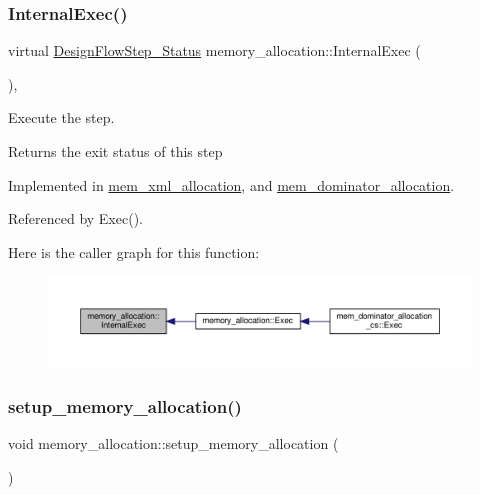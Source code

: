 \subsubsection{\texorpdfstring{Internal\+Exec()}{InternalExec()}}
{\footnotesize\ttfamily virtual \hyperlink{design__flow__step_8hpp_afb1f0d73069c26076b8d31dbc8ebecdf}{Design\+Flow\+Step\+\_\+\+Status} memory\+\_\+allocation\+::\+Internal\+Exec (\begin{DoxyParamCaption}{ }\end{DoxyParamCaption})\hspace{0.3cm}{\ttfamily [protected]}, {}}



Execute the step. 

\begin{DoxyReturn}{Returns}
the exit status of this step 
\end{DoxyReturn}


Implemented in \hyperlink{classmem__xml__allocation_ab52f147c4c950b89428a1c6ad515a7a3}{mem\+\_\+xml\+\_\+allocation}, and \hyperlink{classmem__dominator__allocation_a729c2a36b1495fbccb94e35dd6c433c3}{mem\+\_\+dominator\+\_\+allocation}.



Referenced by Exec().

Here is the caller graph for this function\+:
\nopagebreak
\begin{figure}[H]
\begin{center}
\leavevmode
\includegraphics[width=350pt]{db/d9f/classmemory__allocation_a7d2e79df1dbef9bc6682ca310eb408d5_icgraph}
\end{center}
\end{figure}
\mbox{\label{classmemory__allocation_a6710be700bffc38ad1a65f2b24f7b863}} 
\subsubsection{\texorpdfstring{setup\+\_\+memory\+\_\+allocation()}{setup\_memory\_allocation()}}
{\footnotesize\ttfamily void memory\+\_\+allocation\+::setup\+\_\+memory\+\_\+allocation (\begin{DoxyParamCaption}{ }\end{DoxyParamCaption})\hspace{0.3cm}{\ttfamily [protected]}}



